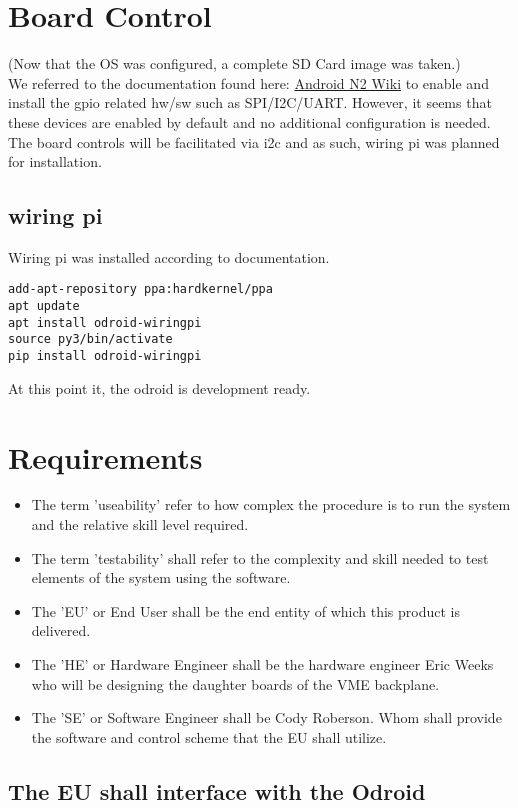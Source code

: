 \documentclass[11pt,letterpaper]{article}
\begin{document}
\section{Board Control}
(Now that the OS was configured, a complete SD Card image was taken.)\\
We referred to the documentation found here:
\href{https://wiki.odroid.com/odroid-n2/application_note/gpio}{Android N2 Wiki}
to enable and install the gpio related hw/sw such as SPI/I2C/UART.
However, it seems that these devices are enabled by default and no additional configuration is needed.
The board controls will be facilitated via i2c and as such, wiring pi was planned for installation.

\subsection{wiring pi}
Wiring pi was installed according to documentation.
\begin{verbatim}
add-apt-repository ppa:hardkernel/ppa
apt update
apt install odroid-wiringpi
source py3/bin/activate
pip install odroid-wiringpi
\end{verbatim}
At this point it, the odroid is development ready.
%
%
\newpage
\section{Requirements}


\begin{itemize}
    \item The term 'useability' refer to how complex the procedure is to run the system and the relative skill level required.
    \item The term 'testability' shall refer to the complexity and skill needed to test elements of the system using the software. 
    \item The 'EU' or End User shall be the end entity of which this product is delivered.
    \item The 'HE' or Hardware Engineer shall be the hardware engineer Eric Weeks who will be designing the daughter boards of the VME backplane.
    \item The 'SE' or Software Engineer shall be Cody Roberson. Whom shall provide the software and control scheme that the EU shall utilize.
\end{itemize}


\subsection{The EU shall interface with the Odroid}
\end{document}
